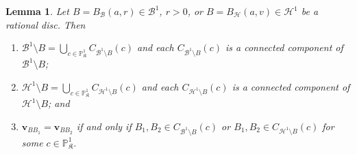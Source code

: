 \documentclass[10pt]{article}
\newtheorem{lemma}[theorem]{Lemma}
\theoremstyle{definition}
\newcommand{\PP}{\mathbb{P}}
\renewcommand{\vec}[1]{\mathbf{#1}}
\begin{document}
\begin{lemma}
  \label{lem:tangentDirectionsRational}
  Let $B=B_{\mathcal{B}}(a,r)\in\mathcal B^1$, $r>0$, or $B=B_{\mathcal{H}}(a,v)\in\mathcal H^1$ be a rational disc.  Then
  \begin{enumerate}
  \item[(i)] $\mathcal B^1\setminus B = \bigcup_{c\in\PP^1_{\mathfrak K}} C_{\mathcal B^1\setminus B}(c)$ and each $C_{\mathcal B^1\setminus B}(c)$ is a connected component of $\mathcal B^1\setminus B$;
  \item[(ii)] $\mathcal H^1\setminus B = \bigcup_{c\in\PP^1_{\mathfrak K}} C_{\mathcal H^1\setminus B}(c)$ and each $C_{\mathcal H^1\setminus B}(c)$ is a connected component of $\mathcal H^1\setminus B$; and
  \item[(iii)] $\vec{v}_{BB_1}=\vec{v}_{BB_2}$ if and only if $B_1,B_2\in C_{\mathcal B^1\setminus B}(c)$ or $B_1,B_2\in C_{\mathcal H^1\setminus B}(c)$ for some $c\in\PP^1_{\mathfrak K}$.
  \end{enumerate}
\end{lemma}
\end{document}
